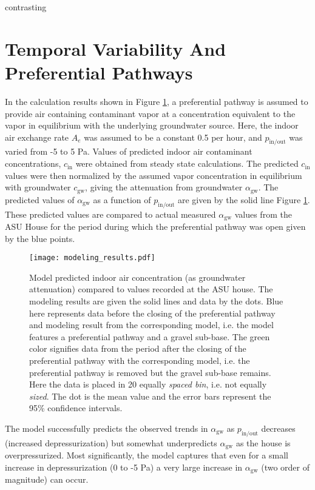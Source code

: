 contrasting\section{Temporal Variability And Preferential Pathways}

In the calculation results shown in Figure \ref{fig:model_results}, a preferential pathway is assumed to provide air containing contaminant vapor at a concentration equivalent to the vapor in equilibrium with the underlying groundwater source.
Here, the indoor air exchange rate $A_e$ was assumed to be a constant 0.5 per hour, and $p_\mathrm{in/out}$ was varied from -5 to 5 Pa.
Values of predicted indoor air contaminant concentrations, $c_\mathrm{in}$ were obtained from steady state calculations.
The predicted $c_\mathrm{in}$ values were then normalized by the assumed vapor concentration in equilibrium with groundwater $c_\mathrm{gw}$, giving the attenuation from groundwater $\alpha_\mathrm{gw}$.
The predicted values of $\alpha_\mathrm{gw}$ as a function of $p_\mathrm{in/out}$ are given by the solid line Figure \ref{fig:model_results}.
These predicted values are compared to actual measured $\alpha_\mathrm{gw}$ values from the ASU House for the period during which the preferential pathway was open given by the blue points.\par

\begin{figure}[htb!]
  \centering
  \texttt{[image: modeling\_results.pdf]}
  \caption{Model predicted indoor air concentration (as groundwater attenuation) compared to values recorded at the ASU house. The modeling results are given the solid lines and data by the dots. Blue here represents data before the closing of the preferential pathway and modeling result from the corresponding model, i.e. the model features a preferential pathway and a gravel sub-base. The green color signifies data from the period after the closing of the preferential pathway with the corresponding model, i.e. the preferential pathway is removed but the gravel sub-base remains. Here the data is placed in 20 equally \textit{spaced bin}, i.e. not equally \textit{sized}. The dot is the mean value and the error bars represent the 95\% confidence intervals.}
  \label{fig:model_results}
\end{figure}

The model successfully predicts the observed trends in $\alpha_\mathrm{gw}$ as $p_\mathrm{in/out}$ decreases (increased depressurization) but somewhat underpredicts $\alpha_\mathrm{gw}$ as the house is overpressurized.
Most significantly, the model captures that even for a small increase in depressurization (0 to -5 Pa) a very large increase in $\alpha_\mathrm{gw}$ (two order of magnitude) can occur.\par

